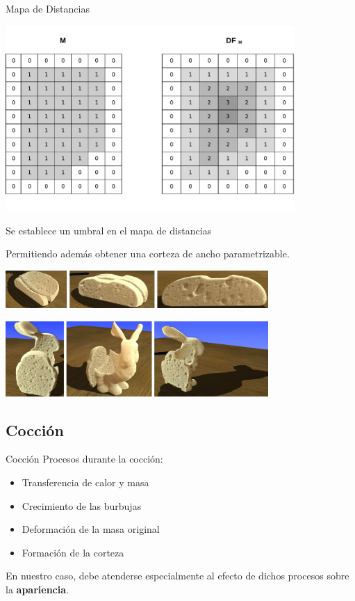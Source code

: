 \documentclass[spanish,unknownkeysallowed]{beamer}
\begin{document}
\begin{frame}{Mapa de Distancias}

\centerline{\includegraphics[width=11cm]{../figures/DistanceTransform}}

\end{frame}

\begin{frame}
Se establece un umbral en el mapa de distancias

Permitiendo además obtener una corteza de ancho parametrizable.


\centerline{\includegraphics[width=10cm]{../figures/prebakebread}}
\centerline{\includegraphics[width=10cm]{../figures/prebakebunny}}
\end{frame}

\subsection{Cocción}

\begin{frame}{Cocción}
Procesos durante la cocción:

\begin{itemize}
\item Transferencia de calor y masa
\item Crecimiento de las burbujas
\item Deformación de la masa original
\item Formación de la corteza
\end{itemize}

En nuestro caso, debe atenderse especialmente al efecto de dichos procesos sobre la \textbf{apariencia}.

\end{frame}
\end{document}
